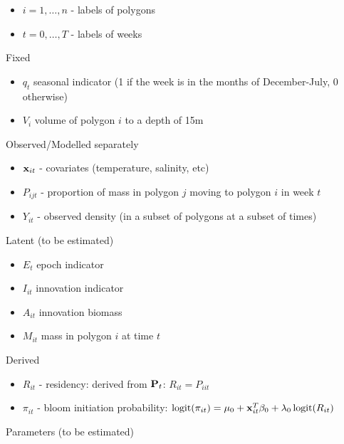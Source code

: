 \documentclass[
]{article}
\providecommand{\tightlist}{%
  \setlength{\itemsep}{0pt}\setlength{\parskip}{0pt}}
\DeclareMathOperator*{\logit}{logit}
\begin{document}
\begin{itemize}
\tightlist
\item
  \(i=1,\ldots,n\) - labels of polygons
\item
  \(t=0,\ldots,T\) - labels of weeks
\end{itemize}

Fixed

\begin{itemize}
\tightlist
\item
  \(q_t\) seasonal indicator (1 if the week is in the months of
  December-July, 0 otherwise)
\item
  \(V_i\) volume of polygon \(i\) to a depth of 15m
\end{itemize}

Observed/Modelled separately

\begin{itemize}
\tightlist
\item
  \({\bf x}_{it}\) - covariates (temperature, salinity, etc)
\item
  \(P_{ijt}\) - proportion of mass in polygon \(j\) moving to polygon
  \(i\) in week \(t\)
\item
  \(Y_{it}\) - observed density (in a subset of polygons at a subset of
  times)
\end{itemize}

Latent (to be estimated)

\begin{itemize}
\tightlist
\item
  \(E_t\) epoch indicator
\item
  \(I_{it}\) innovation indicator
\item
  \(A_{it}\) innovation biomass
\item
  \(M_{it}\) mass in polygon \(i\) at time \(t\)
\end{itemize}

Derived

\begin{itemize}
\tightlist
\item
  \(R_{it}\) - residency: derived from \({\bf P}_t\):
  \(R_{it} = P_{iit}\)
\item
  \(\pi_{it}\) - bloom initiation probability:
  \(\logit(\pi_{it})=\mu_0+{\bf x}_{it}^T{\beta}_0+\lambda_0\logit(R_{it})\)
\end{itemize}

Parameters (to be estimated)
\end{document}
